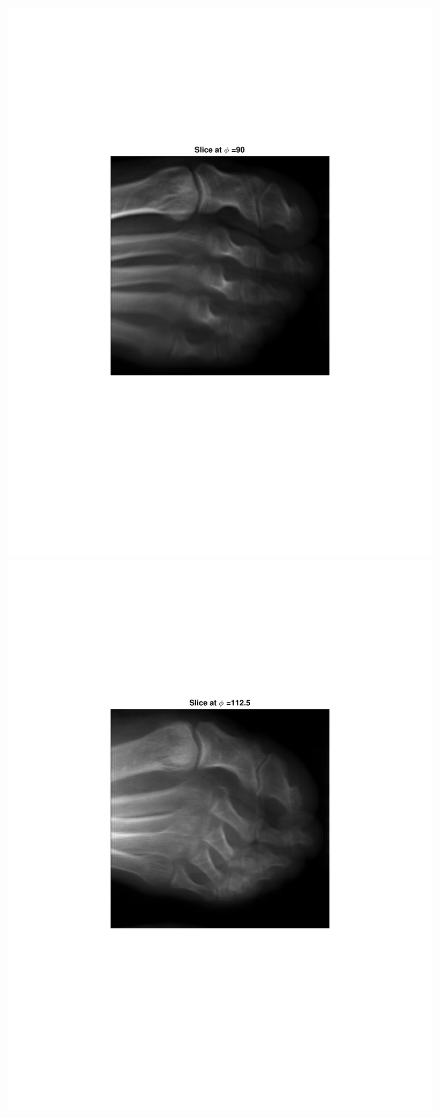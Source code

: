 \documentclass{UCF_ETD}
\begin{document}
\begin{figure}[H]
\begin{center}
\includegraphics[scale=0.5]{FVR/FootSlice90}
\includegraphics[scale=0.5]{FVR/FootSlice113}

\end{center}
\end{figure}
\end{document}
